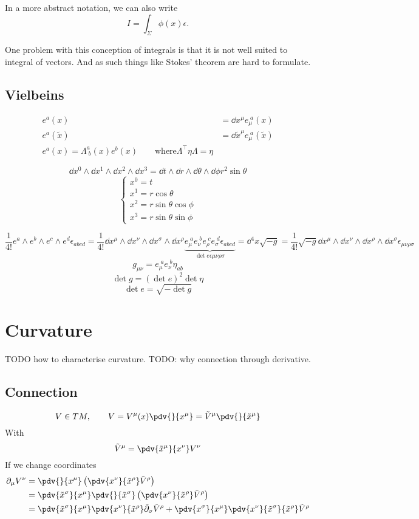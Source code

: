 In a more abstract notation, we can also write
\[ I = \int_\Sigma\phi(x)\epsilon. \]

One problem with this conception of integrals is that it is not well suited to integral of vectors. And as such things like Stokes' theorem are hard to formulate.

\subsection{Vielbeins}
\begin{align*}
e^a(x) &= \dd{x^\mu}e_\mu^{\;a}(x) \\
e^a(\tilde{x}) &= \dd{\tilde{x}^\mu}e_\mu^{\;a}(\tilde{x}) \\
e^a(x) = \Lambda^a_{\;b}(x)e^b(x) \qquad \text{where} \Lambda^\intercal\eta\Lambda = \eta
\end{align*}

\[ \dd{x^0}\wedge\dd{x^1}\wedge\dd{x^2}\wedge\dd{x^3} = \dd{t}\wedge\dd{r}\wedge\dd{\theta}\wedge\dd{\phi}r^2\sin\theta \]
\[ \begin{cases}
x^0 = t \\ x^1 = r\cos\theta \\ x^2 = r\sin\theta\cos\phi \\ x^3 = r\sin\theta\sin\phi
\end{cases} \]

\[ \frac{1}{4!}e^a\wedge e^b\wedge e^c\wedge e^d\epsilon_{abcd} = \frac{1}{4!}\dd{x^\mu}\wedge\dd{x^\nu}\wedge\dd{x^\sigma}\wedge\dd{x^\rho}\underbrace{e_\mu^{\;a}e_\nu^{\;b}e_\rho^{\;c}e_\sigma^{\;d}\epsilon_{abcd}}_{\det e \epsilon{\mu\nu\rho\sigma}} = \dd{^4x}\sqrt{-g} = \frac{1}{4!}\sqrt{-g} \dd{x^\mu}\wedge\dd{x^\nu}\wedge\dd{x^\rho}\wedge\dd{x^\sigma}\epsilon_{\mu\nu\rho\sigma} \]
\[g_{\mu\nu} = e_\mu^{\;a}e_\nu^{\;b}\eta_{ab}\]
\[ \det g = (\det e)^2 \det \eta \]
\[ \det e = \sqrt{-\det g} \]

\section{Curvature}
TODO how to characterise curvature. TODO: why connection through derivative.

\subsection{Connection}
\[ V\in TM, \qquad V = V^\mu(x)\pdv{}{x^\mu} = \tilde{V}^\mu \pdv{}{\tilde{x}^\mu}\]
With
\[ \tilde{V}^\mu = \pdv{\tilde{x}^\mu}{x^\nu}V^\nu \]
If we change coordinates
\begin{align*}
\partial_\mu V^\nu &= \pdv{}{x^\mu}\left(\pdv{x^\nu}{\tilde{x}^\rho}\tilde{V}^\rho\right) \\
&= \pdv{\tilde{x}^\sigma}{x^\mu}\pdv{}{\tilde{x}^\sigma}\left(\pdv{x^\nu}{\tilde{x}^\rho}\tilde{V}^\rho\right) \\
&= \pdv{\tilde{x}^\sigma}{x^\mu}\pdv{x^\nu}{\tilde{x}^\rho}\tilde{\partial}_\sigma\tilde{V}^\rho + \pdv{x^\sigma}{x^\mu}\pdv{x^\nu}{\tilde{x}^\sigma}{\tilde{x}^\rho}\tilde{V}^\rho
\end{align*}

